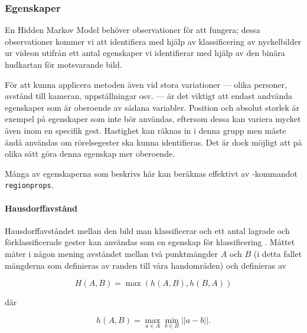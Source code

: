 \documentclass[../rapport_MVEX01-11-05]{subfiles}
\begin{document}
\subsubsection{Egenskaper}
En Hidden Markov Model behöver observationer för att fungera; dessa
observationer kommer vi att identifiera med hjälp av klassificering av
nyckelbilder ur videon utifrån ett antal egenskaper vi identifierar
med hjälp av den binära hudkartan för motsvarande bild.

För att kunna applicera metoden även vid stora variationer --- olika
personer, avstånd till kameran, uppställningar osv. --- är det viktigt
att endast andvända egenskaper som är oberoende av sådana variabler.
Position och absolut storlek är exempel på egenskaper som inte bör
användas, eftersom dessa kan variera mycket även inom en specifik
gest. Hastighet kan räknas in i denna grupp men måste ändå användas
om rörelsegester ska kunna identifieras. Det är dock möjligt att på
olika sätt göra denna egenskap mer oberoende.

Många av egenskaperna som beskrivs här kan beräknas effektivt av
\MATLAB-kommandot \texttt{regionprops}.



\paragraph{Hausdorffavstånd}

Hausdorffavståndet mellan den bild man klassificerar och ett antal
lagrade och förklassificerade gester kan användas som en egenskap för
klassificering \cite{Nielsen04}. Måttet mäter i någon mening avståndet
mellan två punktmängder $A$ och $B$ (i detta fallet mängderna som definieras av
randen till våra handområden) och definieras av

\begin{equation*}
  H(A, B) = \max\left(h(A,B),h(B, A)\right)
\end{equation*}

där

\begin{equation*}
  h(A, B) = \max\limits_{a\in A}\min\limits_{b\in
  B}\left|\left|a-b\right|\right|.
\end{equation*}
\end{document}
